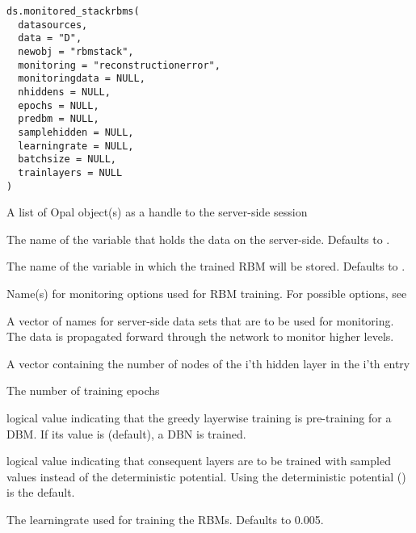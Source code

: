 %
\begin{Usage}
\begin{verbatim}
ds.monitored_stackrbms(
  datasources,
  data = "D",
  newobj = "rbmstack",
  monitoring = "reconstructionerror",
  monitoringdata = NULL,
  nhiddens = NULL,
  epochs = NULL,
  predbm = NULL,
  samplehidden = NULL,
  learningrate = NULL,
  batchsize = NULL,
  trainlayers = NULL
)
\end{verbatim}
\end{Usage}
%
\begin{Arguments}
\begin{ldescription}
\item[\code{datasources}] A list of Opal object(s) as a handle to the server-side session

\item[\code{data}] The name of the variable that holds the data on the server-side.
Defaults to .

\item[\code{newobj}] The name of the variable in which the trained RBM will be stored.
Defaults to .

\item[\code{monitoring}] Name(s) for monitoring options used for RBM training.
For possible options, see 

\item[\code{monitoringdata}] A vector of names for server-side data sets that are to be used for
monitoring. The data is propagated forward through the
network to monitor higher levels.

\item[\code{nhiddens}] A vector containing the number of nodes of the i'th hidden layer in
the i'th entry

\item[\code{epochs}] The number of training epochs

\item[\code{predbm}] logical value indicating that the greedy layerwise training is
pre-training for a DBM.
If its value is  (default), a DBN is trained.

\item[\code{samplehidden}] logical value indicating that consequent layers are to be trained
with sampled values instead of the deterministic potential.
Using the deterministic potential () is the default.

\item[\code{learningrate}] The learningrate used for training the RBMs. Defaults to 0.005.


\end{ldescription}
\end{Arguments}
